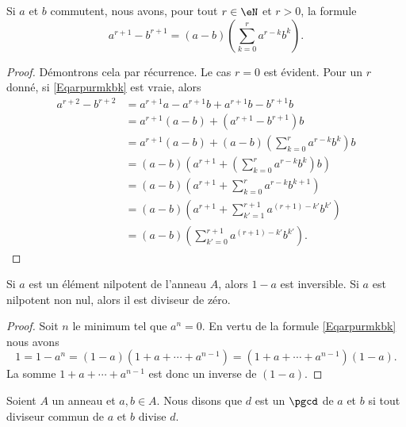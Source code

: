 
\begin{lemma}
    Si \( a\) et \( b\) commutent, nous avons, pour tout \( r \in \eN \) et \( r > 0\), la formule
    \begin{equation}        \label{Eqarpurmkbk}
        a^{r+1}-b^{r+1}=(a-b)\left(\sum_{k=0}^ra^{r-k}b^k\right).
    \end{equation}
\end{lemma}

\begin{proof}
  Démontrons cela par récurrence. Le cas \( r = 0 \) est évident. Pour
  un \( r \) donné, si \eqref{Eqarpurmkbk} est vraie, alors
  \begin{align*}
    a^{r+2}-b^{r+2}&= a^{r+1}a - a^{r+1}b +a^{r+1}b - b^{r+1}b\\
    &= a^{r+1}(a - b) + (a^{r+1} - b^{r+1})b\\
    &= a^{r+1}(a - b) + (a-b)\left(\sum_{k=0}^ra^{r-k}b^k\right)b\\
    &= (a - b) \left(a^{r+1} + \left(\sum_{k=0}^ra^{r-k}b^k\right)b\right)\\
    &= (a - b) \left(a^{r+1} + \sum_{k=0}^ra^{r-k}b^{k + 1}\right)\\
    &= (a - b) \left(a^{r+1} + \sum_{k'=1}^{r+1}a^{(r+1)-k'}b^{k'}\right)\\
    &= (a - b) \left(\sum_{k'=0}^{r+1}a^{(r+1)-k'}b^{k'}\right).
  \end{align*}
\end{proof}

\begin{proposition}
    Si \( a\) est un élément nilpotent de l'anneau \( A\), alors \( 1-a\) est inversible. Si \( a\) est nilpotent non nul, alors il est diviseur de zéro.
\end{proposition}

\begin{proof}
    Soit \( n\) le minimum tel que \( a^n=0\). En vertu de la formule \eqref{Eqarpurmkbk} nous avons
    \begin{equation}
        1=1-a^n=(1-a)(1+a+\cdots+a^{n-1})=(1+a+\cdots+a^{n-1})(1-a).
    \end{equation}
    La somme \( 1+a+\cdots+a^{n-1}\) est donc un inverse de \( (1-a)\).
\end{proof}

\begin{definition}      \label{DEFooTCUOooWHlbee}
    Soient \( A\) un anneau et \( a,b\in A\). Nous disons que \( d\) est un \( \pgcd\) de \( a\) et \( b\) si tout diviseur commun de \( a\) et \( b\) divise \( d\).
\end{definition}

